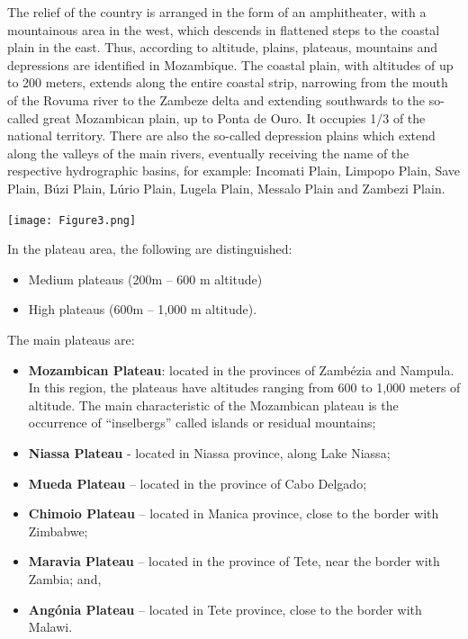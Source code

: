\documentclass[
]{book}
\providecommand{\tightlist}{%
  \setlength{\itemsep}{0pt}\setlength{\parskip}{0pt}}
\begin{document}
The relief of the country is arranged in the form of an amphitheater, with a mountainous area in the west, which descends in flattened steps to the coastal plain in the east. Thus, according to altitude, plains, plateaus, mountains and depressions are identified in Mozambique. The coastal plain, with altitudes of up to 200 meters, extends along the entire coastal strip, narrowing from the mouth of the Rovuma river to the Zambeze delta and extending southwards to the so-called great Mozambican plain, up to Ponta de Ouro. It occupies 1/3 of the national territory. There are also the so-called depression plains which extend along the valleys of the main rivers, eventually receiving the name of the respective hydrographic basins, for example: Incomati Plain, Limpopo Plain, Save Plain, Búzi Plain, Lúrio Plain, Lugela Plain, Messalo Plain and Zambezi Plain.

\texttt{[image: Figure3.png]}

In the plateau area, the following are distinguished:

\begin{itemize}
\tightlist
\item
  Medium plateaus (200m -- 600 m altitude)
\item
  High plateaus (600m -- 1,000 m altitude).
\end{itemize}

The main plateaus are:

\begin{itemize}
\tightlist
\item
  \textbf{Mozambican Plateau}: located in the provinces of Zambézia and Nampula. In this region, the plateaus have altitudes ranging from 600 to 1,000 meters of altitude. The main characteristic of the Mozambican plateau is the occurrence of ``inselbergs'' called islands or residual mountains;
\item
  \textbf{Niassa Plateau} - located in Niassa province, along Lake Niassa;
\item
  \textbf{Mueda Plateau} -- located in the province of Cabo Delgado;
\item
  \textbf{Chimoio Plateau} -- located in Manica province, close to the border with Zimbabwe;
\item
  \textbf{Maravia Plateau} -- located in the province of Tete, near the border with Zambia; and,
\item
  \textbf{Angónia Plateau} -- located in Tete province, close to the border with Malawi.
\end{itemize}
\end{document}
